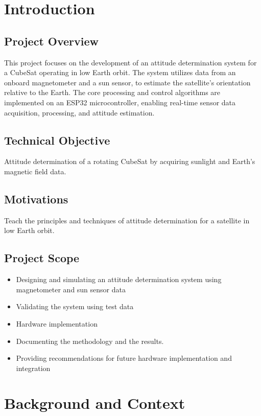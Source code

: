 \documentclass[a4paper, 12pt]{article}
\begin{document}
\newpage
\tableofcontents
\newpage


\listoffigures
\newpage
\section{Introduction}
\subsection{Project Overview}
This project focuses on the development of an attitude determination system for a CubeSat operating in low Earth orbit. The system utilizes data from an onboard magnetometer and a sun sensor, to estimate the satellite’s orientation relative to the Earth. The core processing and control algorithms are implemented on an ESP32 microcontroller, enabling real-time sensor data acquisition, processing, and attitude estimation.

\subsection{Technical Objective}
Attitude determination of a rotating CubeSat by acquiring sunlight and Earth's magnetic field data.

\subsection{Motivations}
Teach the principles and techniques of attitude determination for a satellite in low Earth orbit.

\subsection{Project Scope}
\begin{itemize}
    \item Designing and simulating an attitude determination system using magnetometer and sun sensor data
    \item Validating the system using test data
    \item Hardware implementation
    \item Documenting the methodology and the results.
    \item Providing recommendations for future hardware implementation and integration
\end{itemize}


\section{Background and Context}
\end{document}
